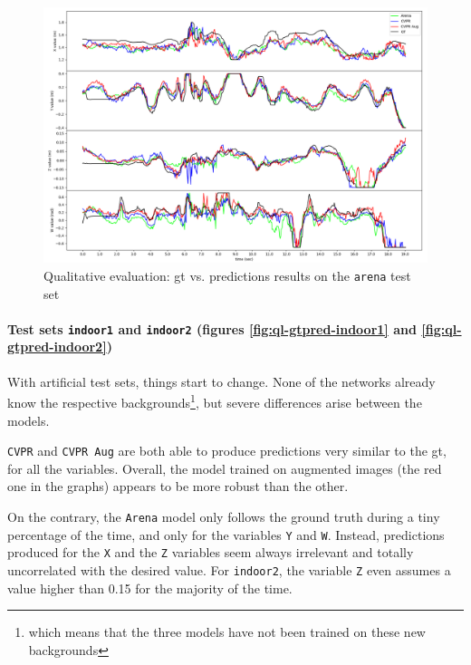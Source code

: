 \begin{figure}[!h]
	\centering
	\includegraphics[width=1 \textwidth]{"contents/images/06-gtpred-arena"}
	\caption[Qualitative evaluation: \gls{gt} vs. predictions results on the \texttt{arena} test set]{Qualitative evaluation: \gls{gt} vs. predictions results on the \texttt{arena} test set}
	\label{fig:ql-gtpred-arena}
\end{figure}


\paragraph*{Test sets \texttt{indoor1} and \texttt{indoor2} (figures \ref{fig:ql-gtpred-indoor1} and \ref{fig:ql-gtpred-indoor2})}

With artificial test sets, things start to change. None of the networks already know the respective backgrounds\footnote{which means that the three models have not been trained on these new backgrounds}, but severe differences arise between the models. 

\texttt{CVPR} and \texttt{CVPR Aug} are both able to produce predictions very similar to the \gls{gt}, for all the variables. Overall, the model trained on augmented images (the red one in the graphs) appears to be more robust than the other.

On the contrary, the \texttt{Arena} model only follows the ground truth during a tiny percentage of the time, and only for the variables \texttt{Y} and \texttt{W}. Instead, predictions produced for the \texttt{X} and the \texttt{Z} variables seem always irrelevant and totally uncorrelated with the desired value. For \texttt{indoor2}, the variable \texttt{Z} even assumes a value higher than 0.15 for the majority of the time.

